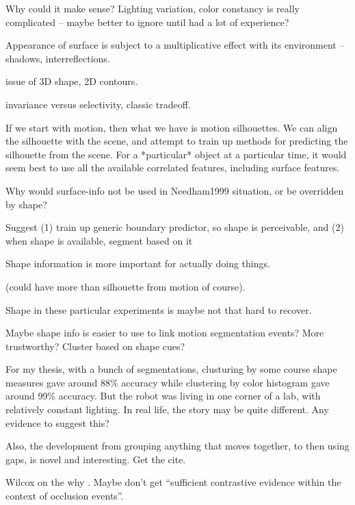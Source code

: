 Why could it make sense?  Lighting variation, color constancy is
really complicated -- maybe better to ignore until had a lot
of experience?

Appearance of surface is subject to a multiplicative effect
with its environment -- shadows, interreflections.

issue of 3D shape, 2D contours.

invariance versus selectivity, classic tradeoff.

If we start with motion, then what we have is motion silhouettes.
We can align the silhouette with the scene, and attempt to train
up methods for predicting the silhouette from the scene.
For a *particular* object at a particular time, it would seem 
best to use all the available correlated features, including 
surface features.  

Why would surface-info not be used in Needham1999 situation,
or be overridden by shape?

Suggest (1) train up generic boundary predictor, so
shape is perceivable, and (2) when shape is available,
segment based on it

Shape information is more important for actually doing things.

(could have more than silhouette from motion of course).


Shape in these particular experiments is maybe not that hard to
recover.

Maybe shape info is easier to use to link motion segmentation
events?  More trustworthy?  Cluster based on shape cues?

For my thesis, with a bunch of segmentations, clusturing by
some course shape measures gave around 88\% accuracy while
clustering by color histogram gave around 99\% accuracy.
But the robot was living in one corner of a lab, with 
relatively constant lighting.  In real life, the story may
be quite different.  Any evidence to suggest this?

Also, the development from grouping anything that moves
together, to then using gaps, is novel and interesting.
Get the cite.


Wilcox on the why \cite{wilcox99object}.  Maybe don't get
``sufficient contrastive evidence within the context of
occlusion events''.

